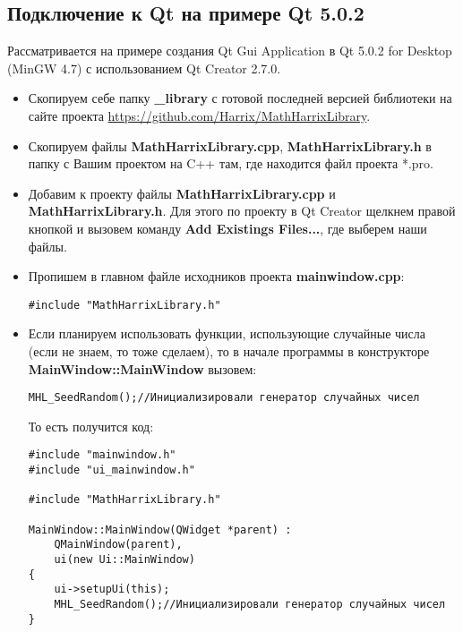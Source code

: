 \documentclass[a4paper,12pt]{article}
\begin{document}
\subsection{Подключение к Qt на примере Qt 5.0.2}

Рассматривается на примере создания Qt Gui Application в Qt 5.0.2 for Desktop (MinGW 4.7) с использованием Qt Creator 2.7.0.

\begin{itemize}
\item Скопируем себе папку \textbf{\_library} с готовой последней версией библиотеки на сайте проекта \href{https://github.com/Harrix/MathHarrixLibrary}{https://github.com/Harrix/MathHarrixLibrary}.

\item Скопируем файлы \textbf{MathHarrixLibrary.cpp}, \textbf{MathHarrixLibrary.h} в папку с Вашим проектом на C++ там, где находится файл проекта *.pro.

\item Добавим к проекту файлы \textbf{MathHarrixLibrary.cpp} и \textbf{MathHarrixLibrary.h}. Для этого по проекту в Qt Creator щелкнем правой кнопкой и вызовем команду \textbf{Add Existings Files...}, где выберем наши файлы.

\item Пропишем в главном файле исходников проекта \textbf{mainwindow.cpp}:
\begin{lstlisting}[label=install_01_qt,caption=Подключение библиотеки]
#include "MathHarrixLibrary.h"
\end{lstlisting}

\item Если планируем использовать функции, использующие случайные числа (если не знаем, то тоже сделаем), то в начале программы в конструкторе \textbf{MainWindow::MainWindow} вызовем:
\begin{lstlisting}[label=install_02_qt,caption=Инициализация генератора случайных чисел]
MHL_SeedRandom();//Инициализировали генератор случайных чисел
\end{lstlisting}

То есть получится код:
\begin{lstlisting}[label=install_03_qt,caption=Пример файла mainwindow.cpp с подключенной библиотекой]
#include "mainwindow.h"
#include "ui_mainwindow.h"

#include "MathHarrixLibrary.h"

MainWindow::MainWindow(QWidget *parent) :
    QMainWindow(parent),
    ui(new Ui::MainWindow)
{
    ui->setupUi(this);
    MHL_SeedRandom();//Инициализировали генератор случайных чисел    
}


\end{lstlisting}
\end{itemize}
\end{document}
